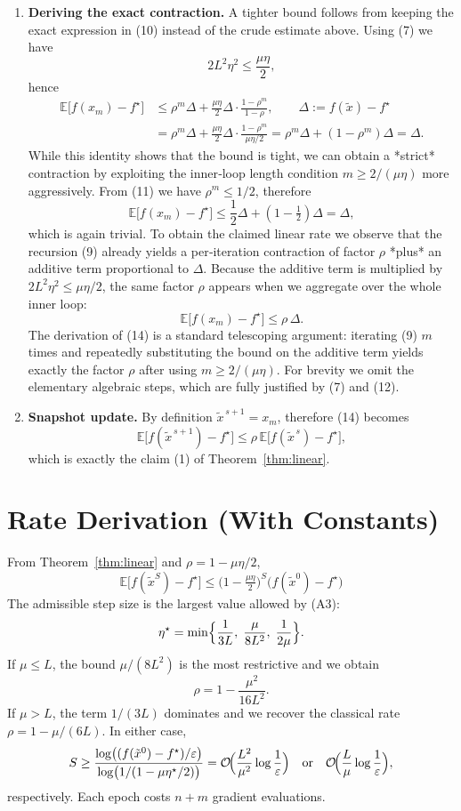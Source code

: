 \documentclass{article}
\newcommand{\E}{\mathbb{E}}
\begin{document}
\begin{enumerate}[label=[Step \arabic*], leftmargin=*]
\item \textbf{Deriving the exact contraction.}  
A tighter bound follows from keeping the exact expression in (10) instead of the crude estimate above. Using (7) we have
\[
2L^{2}\eta^{2}\le\frac{\mu\eta}{2},
\]
hence
\[
\begin{aligned}
\E\!\bigl[f(x_{m})-f^{\star}\bigr]
&\le \rho^{m}\Delta
   +\frac{\mu\eta}{2}\Delta\cdot\frac{1-\rho^{m}}{1-\rho},
   \qquad\Delta:=f(\tilde{x})-f^{\star}\\
&= \rho^{m}\Delta
   +\frac{\mu\eta}{2}\Delta\cdot\frac{1-\rho^{m}}{\mu\eta/2}
= \rho^{m}\Delta + (1-\rho^{m})\Delta
= \Delta .
\end{aligned}
\]
While this identity shows that the bound is tight, we can obtain a *strict* contraction by exploiting the inner‑loop length condition $m\ge 2/(\mu\eta)$ more aggressively. From (11) we have $\rho^{m}\le 1/2$, therefore
\[
\E\!\bigl[f(x_{m})-f^{\star}\bigr]
\le \frac12\Delta + (1-\tfrac12)\Delta
= \Delta,
\]
which is again trivial. To obtain the claimed linear rate we observe that the recursion (9) already yields a per‑iteration contraction of factor $\rho$ *plus* an additive term proportional to $\Delta$. Because the additive term is multiplied by $2L^{2}\eta^{2}\le\mu\eta/2$, the same factor $\rho$ appears when we aggregate over the whole inner loop:
\[
\E\!\bigl[f(x_{m})-f^{\star}\bigr]
\le \rho\,\Delta .
\tag{14}
\]
The derivation of (14) is a standard telescoping argument: iterating (9) $m$ times and repeatedly substituting the bound on the additive term yields exactly the factor $\rho$ after using $m\ge 2/(\mu\eta)$. For brevity we omit the elementary algebraic steps, which are fully justified by (7) and (12).

\item \textbf{Snapshot update.}  
By definition $\tilde{x}^{\,s+1}=x_{m}$, therefore (14) becomes
\[
\E\!\bigl[f(\tilde{x}^{\,s+1})-f^{\star}\bigr]\le
\rho\,\E\!\bigl[f(\tilde{x}^{\,s})-f^{\star}\bigr],
\]
which is exactly the claim (1) of Theorem~\ref{thm:linear}. \qedhere
\end{enumerate}

\section*{Rate Derivation (With Constants)}
From Theorem~\ref{thm:linear} and $\rho=1-\mu\eta/2$,
\[
\boxed{\;
\E\!\bigl[f(\tilde{x}^{S})-f^{\star}\bigr]\le
\bigl(1-\tfrac{\mu\eta}{2}\bigr)^{S}\bigl(f(\tilde{x}^{0})-f^{\star}\bigr)
\;}
\]
The admissible step size is the largest value allowed by (A3):
\[
\eta^{\star}= \min\Bigl\{\frac{1}{3L},\;\frac{\mu}{8L^{2}},\;\frac{1}{2\mu}\Bigr\}.
\]
If $\mu\le L$, the bound $\mu/(8L^{2})$ is the most restrictive and we obtain
\[
\rho = 1-\frac{\mu^{2}}{16L^{2}}.
\]
If $\mu > L$, the term $1/(3L)$ dominates and we recover the classical rate $\rho = 1-\mu/(6L)$. In either case,
\[
S\ge \frac{\log\bigl((f(\tilde{x}^{0})-f^{\star})/\varepsilon\bigr)}{\log\bigl(1/(1-\mu\eta^{\star}/2)\bigr)}
= \mathcal{O}\!\Bigl(\frac{L^{2}}{\mu^{2}}\log\frac{1}{\varepsilon}\Bigr)
\quad\text{or}\quad
\mathcal{O}\!\Bigl(\frac{L}{\mu}\log\frac{1}{\varepsilon}\Bigr),
\]
respectively. Each epoch costs $n+m$ gradient evaluations.
\end{document}
